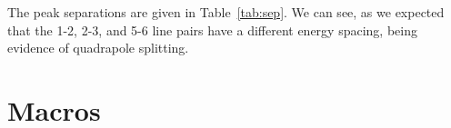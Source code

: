 \documentclass[paper=a4, fontsize=11pt, abstract=on]{scrartcl} %
\numberwithin{equation}{section}
\numberwithin{figure}{section}
\numberwithin{table}{section}
\begin{document}
The peak separations are given in
Table~\ref{tab:sep}. We can see, as we expected that the 1-2, 2-3, and
5-6 line pairs have a different energy spacing, being evidence of
quadrapole splitting.

\appendix

\section{Macros}
\label{sec:macros}




\end{document}
